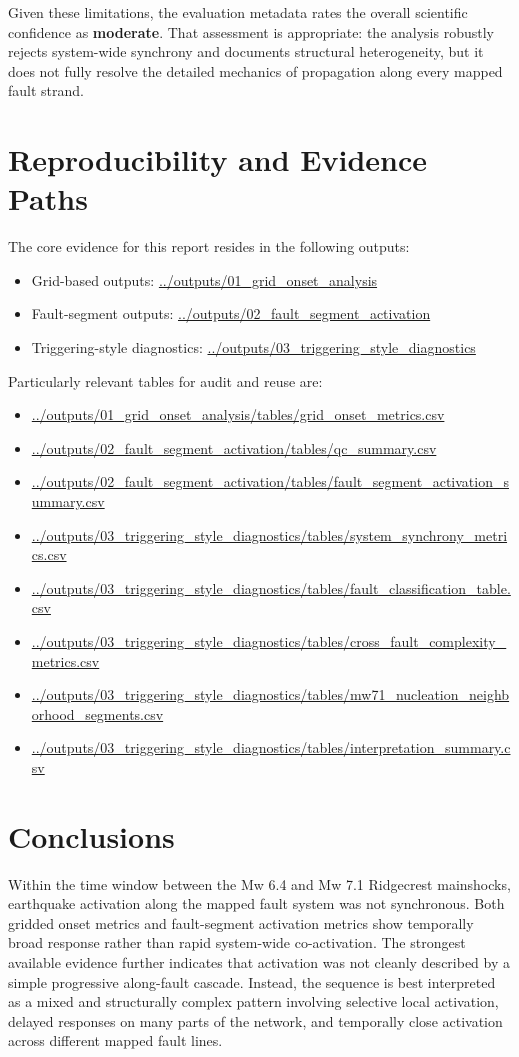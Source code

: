 \documentclass[11pt]{article}
\begin{document}
Given these limitations, the evaluation metadata rates the overall scientific confidence as \textbf{moderate}. That assessment is appropriate: the analysis robustly rejects system-wide synchrony and documents structural heterogeneity, but it does not fully resolve the detailed mechanics of propagation along every mapped fault strand.

\section{Reproducibility and Evidence Paths}
The core evidence for this report resides in the following outputs:
\begin{itemize}
    \item Grid-based outputs: \url{../outputs/01_grid_onset_analysis}
    \item Fault-segment outputs: \url{../outputs/02_fault_segment_activation}
    \item Triggering-style diagnostics: \url{../outputs/03_triggering_style_diagnostics}
\end{itemize}

Particularly relevant tables for audit and reuse are:
\begin{itemize}
    \item \url{../outputs/01_grid_onset_analysis/tables/grid_onset_metrics.csv}
    \item \url{../outputs/02_fault_segment_activation/tables/qc_summary.csv}
    \item \url{../outputs/02_fault_segment_activation/tables/fault_segment_activation_summary.csv}
    \item \url{../outputs/03_triggering_style_diagnostics/tables/system_synchrony_metrics.csv}
    \item \url{../outputs/03_triggering_style_diagnostics/tables/fault_classification_table.csv}
    \item \url{../outputs/03_triggering_style_diagnostics/tables/cross_fault_complexity_metrics.csv}
    \item \url{../outputs/03_triggering_style_diagnostics/tables/mw71_nucleation_neighborhood_segments.csv}
    \item \url{../outputs/03_triggering_style_diagnostics/tables/interpretation_summary.csv}
\end{itemize}

\section{Conclusions}
Within the time window between the Mw 6.4 and Mw 7.1 Ridgecrest mainshocks, earthquake activation along the mapped fault system was not synchronous. Both gridded onset metrics and fault-segment activation metrics show temporally broad response rather than rapid system-wide co-activation. The strongest available evidence further indicates that activation was not cleanly described by a simple progressive along-fault cascade. Instead, the sequence is best interpreted as a mixed and structurally complex pattern involving selective local activation, delayed responses on many parts of the network, and temporally close activation across different mapped fault lines.
\end{document}
